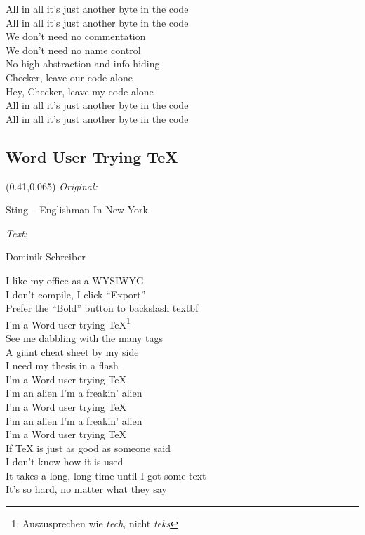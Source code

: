 \documentclass[11pt,a5paper]{article}
\newcommand\songinfo[2]{\begin{textblock}{0.5}(0.41,0.065)
		\footnotesize
		\hfill \textit{Original:} \ \ \ \ \ \ \ \ \ \ \ \ \ \ \ \ \ \ \ \ 
		
		\hfill #1
		
		\hfill  \textit{Text:} \ \ \ \ \ \ \ \ \ \ \ \ \ \ \ \ \ \ \ \ 
		
		\hfill #2
	\end{textblock}}
\begin{document}
			All in all it’s just another byte in the code \\
			All in all it’s just another byte in the code \\
			
			We don’t need no commentation \\
			We don’t need no name control \\
			No high abstraction and info hiding \\
			Checker, leave our code alone \\
			Hey, Checker, leave my code alone \\
			
			All in all it’s just another byte in the code \\
			All in all it’s just another byte in the code \\
			
			\pagebreak
			\subsection{Word User Trying \TeX }
			\songinfo{Sting -- Englishman In New York}{Dominik Schreiber}
			I like my office as a WYSIWYG \\
			I don’t compile, I click “Export” \\
			Prefer the “Bold” button to backslash textbf \\
			I’m a Word user trying TeX\footnote{Auszusprechen wie \textit{tech}, nicht \textit{teks}}  \\
			
			See me dabbling with the many tags \\
			A giant cheat sheet by my side \\
			I need my thesis in a flash \\
			I’m a Word user trying \TeX \\
			
			I’m an alien I’m a freakin’ alien \\
			I’m a Word user trying \TeX \\
			I’m an alien I’m a freakin’ alien \\
			I’m a Word user trying \TeX \\
			
			If TeX is just as good as someone said \\
			I don’t know how it is used \\
			It takes a long, long time until I got some text \\
			It’s so hard, no matter what they say \\
			
\end{document}
